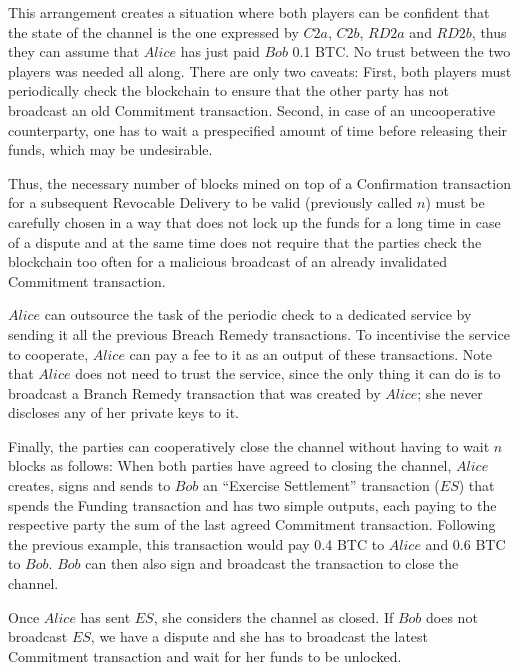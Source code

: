 \begin{itemize}
    This arrangement creates a situation where both players can be confident that the
    state of the channel is the one expressed by $C2a$, $C2b$, $RD2a$ and $RD2b$, thus
    they can assume that $Alice$ has just paid $Bob$ 0.1 BTC. No trust between the two
    players was needed all along. There are only two caveats: First, both players must
    periodically check the blockchain to ensure that the other party has not broadcast an
    old Commitment transaction. Second, in case of an uncooperative counterparty, one has
    to wait a prespecified amount of time before releasing their funds, which may be
    undesirable.

    Thus, the necessary number of blocks mined on top of a Confirmation transaction for a
    subsequent Revocable Delivery to be valid (previously called $n$) must be carefully
    chosen in a way that does not lock up the funds for a long time in case of a dispute
    and at the same time does not require that the parties check the blockchain too often
    for a malicious broadcast of an already invalidated Commitment transaction.

    $Alice$ can outsource the task of the periodic check to a dedicated service by sending
    it all the previous Breach Remedy transactions. To incentivise the service to
    cooperate, $Alice$ can pay a fee to it as an output of these transactions. Note that
    $Alice$ does not need to trust the service, since the only thing it can do is to
    broadcast a Branch Remedy transaction that was created by $Alice$; she never discloses
    any of her private keys to it.

    Finally, the parties can cooperatively close the channel without having to wait $n$
    blocks as follows: When both parties have agreed to closing the channel, $Alice$
    creates, signs and sends to $Bob$ an ``Exercise Settlement'' transaction ($ES$) that
    spends the Funding transaction and has two simple outputs, each paying to the
    respective party the sum of the last agreed Commitment transaction. Following the
    previous example, this transaction would pay 0.4 BTC to $Alice$ and 0.6 BTC to $Bob$.
    $Bob$ can then also sign and broadcast the transaction to close the channel.

    Once $Alice$ has sent $ES$, she considers the channel as closed. If $Bob$ does not
    broadcast $ES$, we have a dispute and she has to broadcast the latest Commitment
    transaction and wait for her funds to be unlocked. \\


\end{itemize}
